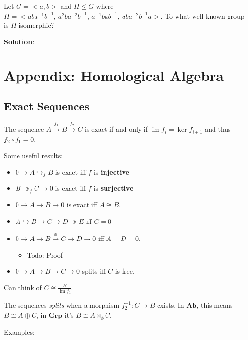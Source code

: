 Let \(G = <a, b>\) and \(H \leq G\) where
\(H = <aba^{-1}b^{-1},~ a^2ba^{-2}b^{-1},~ a^{-1}bab^{-1},~ aba^{-2}b^{-1}a>\).
To what well-known group is \(H\) isomorphic?

\textbf{Solution}:

\hypertarget{appendix-homological-algebra}{%
\section{Appendix: Homological
Algebra}\label{appendix-homological-algebra}}

\hypertarget{exact-sequences}{%
\subsection{Exact Sequences}\label{exact-sequences}}

The sequence \(A \xrightarrow{f_1} B \xrightarrow{f_2} C\) is exact if
and only if \(\operatorname{im}f_i = \ker f_{i+1}\) and thus
\(f_2 \circ f_1 = 0\).

Some useful results:

\begin{itemize}
\tightlist
\item
  \(0 \to A \hookrightarrow_{f} B\) is exact iff \(f\) is
  \textbf{injective}
\item
  \(B\twoheadrightarrow_{f} C \to 0\) is exact iff \(f\) is
  \textbf{surjective}
\item
  \(0\to A \to B \to 0\) is exact iff \(A \cong B\).
\item
  \(A \hookrightarrow B \to C \to D \twoheadrightarrow E\) iff \(C = 0\)
\item
  \(0\to A \to B \xrightarrow{\cong} C \to D\to 0\) iff \(A = D = 0\).

  \begin{itemize}
  \tightlist
  \item
    Todo: Proof
  \end{itemize}
\item
  \(0\to A\to B \to C \to 0\) splits iff \(C\) is free.
\end{itemize}

Can think of \(C \cong \frac{B}{\operatorname{im}f_1}\).

The sequences \emph{splits} when a morphism \(f_2^{-1}: C \to B\)
exists. In \(\textbf{Ab}\), this means \(B \cong A \oplus C\), in
\(\mathbf{Grp}\) it's \(B \cong A \rtimes_\phi C\).

Examples:

